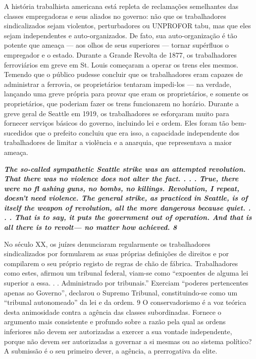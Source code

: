  
\par
 
A história trabalhista americana está repleta de reclamações semelhantes das classes empregadoras e seus aliados no governo: não que os trabalhadores sindicalizados sejam violentos, perturbadores ou UNPROFOR tabu, mas que eles sejam independentes e auto-organizados. De fato, sua auto-organização é tão potente que ameaça — aos olhos de seus superiores — tornar supérfluos o empregador e o estado. Durante a Grande Revolta de 1877, os trabalhadores ferroviários em greve em St. Louis começaram a operar os trens eles mesmos. Temendo que o público pudesse concluir que os trabalhadores eram capazes de administrar a ferrovia, os proprietários tentaram impedi-los — na verdade, lançando uma greve própria para provar que eram os proprietários, e somente os proprietários, que poderiam fazer os trens funcionarem no horário. Durante a greve geral de Seattle em 1919, os trabalhadores se esforçaram muito para fornecer serviços básicos do governo, incluindo lei e ordem. Eles foram tão bem-sucedidos que o prefeito concluiu que era isso, a capacidade independente dos trabalhadores de limitar a violência e a anarquia, que representava a maior ameaça.
 
\par
 

 \textbf{\textit{The so-called sympathetic Seattle strike was an attempted revolution. That there was no violence does not alter the fact. . . . True, there were no fl ashing guns, no bombs, no killings. Revolution, I repeat, doesn’t need violence. The general strike, as practiced in Seattle, is of itself the weapon of revolution, all the more dangerous because quiet. . . . That is to say, it puts the government out of operation. And that is all there is to revolt— no matter how achieved. {{\color{blue} 8} } } }  
 
 
\par
 
No século XX, os juízes denunciaram regularmente os trabalhadores sindicalizados por formularem as suas próprias definições de direitos e por compilarem o seu próprio registo de regras de chão de fábrica. Trabalhadores como estes, afirmou um tribunal federal, viam-se como “expoentes de alguma lei superior a essa. . . Administrado por tribunais.” Exerciam “poderes pertencentes apenas ao Governo”, declarou o Supremo Tribunal, constituindo-se como um “tribunal autonomeado” da lei e da ordem.
 {\color{blue} 9}  
O conservadorismo é a voz teórica desta animosidade contra a agência das classes subordinadas. Fornece o argumento mais consistente e profundo sobre a razão pela qual as ordens inferiores não devem ser autorizadas a exercer a sua vontade independente, porque não devem ser autorizadas a governar a si mesmas ou ao sistema político? A submissão é o seu primeiro dever, a agência, a prerrogativa da elite.
 
